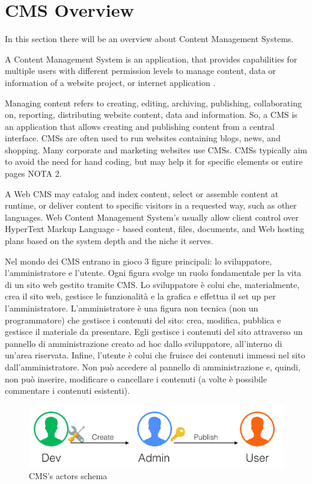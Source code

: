 \section{CMS Overview}
\label{sec:CMS_overview}

In this section there will be an overview about Content Management Systems.

A Content Management System is an application, that provides capabilities for multiple users with different permission levels to manage content, data or information of a website project, or internet application \cite{cms_def}.

Managing content refers to creating, editing, archiving, publishing, collaborating on, reporting, distributing website content, data and information.
So, a CMS is an application that allows creating and publishing content from a central interface. CMSs are often used to run websites containing blogs, news, and shopping. Many corporate and marketing websites use CMSs. CMSs typically aim to avoid the need for hand coding, but may help it for specific elements or entire pages NOTA 2. 

A Web CMS may catalog and index content, select or assemble content at runtime, or deliver content to specific visitors in a requested way, such as other languages. Web Content Management System's usually allow client control over HyperText Markup Language - based content, files, documents, and Web hosting plans based on the system depth and the niche it serves.



Nel mondo dei CMS entrano in gioco 3 figure principali: lo sviluppatore, l’amministratore e l’utente. Ogni figura svolge un ruolo fondamentale per la vita di un sito web gestito tramite CMS.
Lo sviluppatore è colui che, materialmente, crea il sito web, gestisce le funzionalità e la grafica e effettua il set up per l’amministratore.
L’amministratore è una figura non tecnica (non un programmatore) che gestisce i contenuti del sito: crea, modifica, pubblica e gestisce il materiale da presentare. Egli gestisce i contenuti del sito attraverso un pannello di amministrazione creato ad hoc dallo sviluppatore, all’interno di un’area riservata.
Infine, l’utente è colui che fruisce dei contenuti immessi nel sito dall’amministratore. Non può accedere al pannello di amministrazione e, quindi, non può inserire, modificare o cancellare i contenuti (a volte è possibile commentare i contenuti esistenti).



\begin {figure}[h]
\graphicspath{{images/chapter_cms/}}
\includegraphics[width=\textwidth]{cms_schema}
\caption{CMS's actors schema}
\end {figure}



